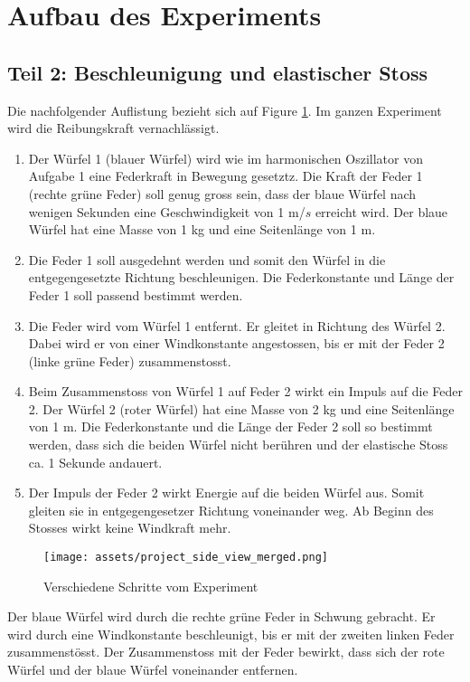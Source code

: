 \documentclass{article}
\begin{document}
\begin{titlepage}
\tableofcontents
\end{titlepage}

\section{Aufbau des Experiments}
\subsection{Teil 2: Beschleunigung und elastischer Stoss}

Die nachfolgender Auflistung bezieht sich auf Figure \ref{fig:project_side_view_merged}. Im ganzen Experiment wird die Reibungskraft vernachlässigt. 
\begin{enumerate}
    \item Der Würfel 1 (blauer Würfel) wird wie im harmonischen Oszillator von Aufgabe 1 eine Federkraft in Bewegung gesetztz. Die Kraft der Feder 1 (rechte grüne Feder) soll genug gross sein, dass der blaue Würfel nach wenigen Sekunden eine Geschwindigkeit von 1 m/\( s \) erreicht wird. Der blaue Würfel hat eine Masse von 1 kg und eine Seitenlänge von 1 m.
    \item Die Feder 1 soll ausgedehnt werden und somit den Würfel in die entgegengesetzte Richtung beschleunigen. Die Federkonstante und Länge der Feder 1 soll passend bestimmt werden.
    \item Die Feder wird vom Würfel 1 entfernt. Er gleitet in Richtung des Würfel 2. Dabei wird er von einer Windkonstante angestossen, bis er mit der Feder 2 (linke grüne Feder) zusammenstosst.
    \item Beim Zusammenstoss von Würfel 1  auf Feder 2 wirkt ein Impuls auf die Feder 2. Der Würfel 2 (roter Würfel) hat eine Masse von 2 kg und eine Seitenlänge von 1 m. Die Federkonstante und die Länge der Feder 2 soll so bestimmt werden, dass sich die beiden Würfel nicht berühren und der elastische Stoss ca. 1 Sekunde andauert.
    \item Der Impuls der Feder 2 wirkt Energie auf die beiden Würfel aus. Somit gleiten sie in entgegengesetzer Richtung voneinander weg. Ab Beginn des Stosses wirkt keine Windkraft mehr.
\end{enumerate}
\begin{figure}[H] 
\centering\texttt{[image: assets/project\_side\_view\_merged.png]}
\scriptsize
\caption{Verschiedene Schritte vom Experiment}
\label{fig:project_side_view_merged}
\end{figure}
\noindent
Der blaue Würfel wird durch die rechte grüne Feder in Schwung gebracht. Er wird durch eine Windkonstante beschleunigt, bis er mit der zweiten linken Feder zusammenstösst. Der Zusammenstoss mit der Feder bewirkt, dass sich der rote Würfel und der blaue Würfel voneinander entfernen.
\end{document}
